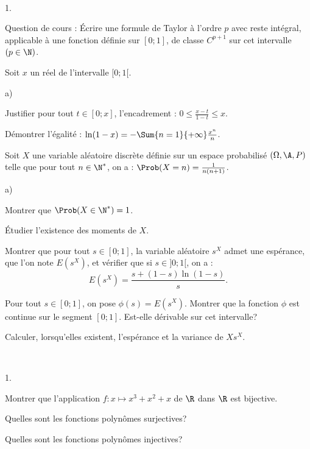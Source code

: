 \documentclass[11pt]{article}%
\begin{document}
\begin{exerciceAP}~
  \begin{noliste}{1.}
    \setlength{\itemsep}{2mm}
  \item Question de cours : Écrire une formule de Taylor à l'ordre $p$
    avec reste intégral, applicable à une fonction définie sur
    $[0;1]$, de classe $C^{p+1}$ sur cet intervalle $(p \in \N)$.

  \item Soit $x$ un réel de l'intervalle $[0;1[$. 
    \begin{noliste}{a)}
    \setlength{\itemsep}{2mm}
    \item Justifier pour tout $t \in [0;x]$, l'encadrement : $0 \leq
      \frac{ x - t }{ 1 - t } \leq x $.
    \item Démontrer l'égalité : $\ln (1-x) = - \Sum{n=1}{+\infty}
      \frac{ x^n }{ n }$.
    \end{noliste}

  \item Soit $X$ une variable aléatoire discrète définie sur un espace
    probabilisé $(\Omega , \A , P)$ telle que pour tout $n \in \N^*$,
    on a : $\Prob(X=n) = \frac{ 1 }{ n ( n+1) }$.
    \begin{noliste}{a)}
    \setlength{\itemsep}{2mm}
    \item Montrer que $\Prob(X \in \N^*) = 1$.
    \item Étudier l'existence des moments de $X$.
    \item Montrer que pour tout $s \in [0;1]$, la variable aléatoire
      $s^X$ admet une espérance, que l'on note $E (s^X)$, et vérifier
      que si $s \in ]0;1[$, on a :
      \[
      E ( s^X ) = \frac{ s + (1-s) \ln (1-s) }{ s } . 
      \]

    \item Pour tout $s \in [0;1]$, on pose $\phi(s) = E
      (s^X)$. Montrer que la fonction $\phi$ est continue sur le
      segment $[0;1]$. Est-elle dérivable sur cet intervalle?

    \item Calculer, lorsqu'elles existent, l'espérance et la variance
      de $X s^X$.
    \end{noliste}
  \end{noliste}
\end{exerciceAP}


\begin{exerciceSP}~
  \begin{noliste}{1.}
    \setlength{\itemsep}{2mm}
  \item Montrer que l'application $f : x \mapsto x^3 + x^2 + x$ de
    $\R$ dans $\R$ est bijective.
  \item Quelles sont les fonctions polynômes surjectives?
  \item Quelles sont les fonctions polynômes injectives?
  \end{noliste}
\end{exerciceSP}
\end{document}
